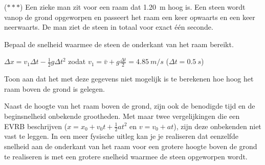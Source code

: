 \documentclass{ximera}
\begin{document}
\begin{exercise}
    ($\ast\ast\ast$) Een zieke man zit voor een raam dat \SI{1,20}{m} hoog is. Een steen wordt vanop de grond opgeworpen en passeert het raam een keer opwaarts en een keer neerwaarts. De man ziet de steen in totaal voor exact één seconde.%

    \begin{question} Bepaal de snelheid waarmee de steen de onderkant van het raam bereikt.  
        \begin{oplossing} $\Delta x= v_1\Delta t-\frac{1}{2}g\Delta t^2$ zodat $v_1=\bar{v}+g\frac{\Delta t}{2}=\SI{4,85}{m/s}$ ($\Delta t = \SI{0,5}{s}$) 
        \end{oplossing} 
    \end{question} %
    
    \begin{question} Toon aan dat het met deze gegevens niet mogelijk is te berekenen hoe hoog het raam boven de grond is gelegen. 
        \begin{oplossing} Naast de hoogte van het raam boven de grond, zijn ook de benodigde tijd en de beginsnelheid onbekende grootheden. Met maar twee vergelijkingen die een EVRB beschrijven ($x=x_0+v_0t+\frac{1}{2}at^2$ en $v=v_0+at$), zijn deze onbekenden niet vast te leggen. 
        In een meer fysische uitleg kan je je realiseren dat eenzelfde snelheid aan de onderkant van het raam voor een grotere hoogte boven de grond te realiseren is met een grotere snelheid waarmee de steen opgeworpen wordt. 
        \end{oplossing} 
    \end{question} 
\end{exercise}
\end{document}
